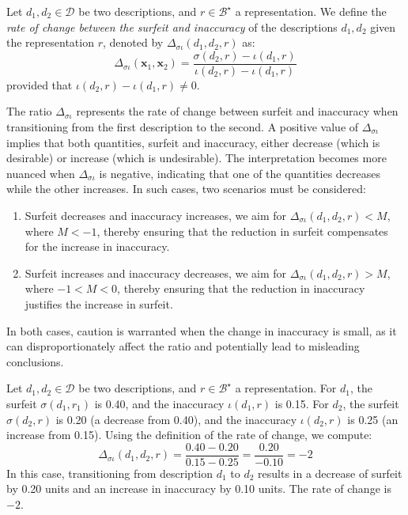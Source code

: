 \begin{definition}
Let $d_1, d_2 \in \mathcal{D}$ be two descriptions, and $r \in \mathcal{B}^\star$ a representation. We define the \emph{rate of change between the surfeit and inaccuracy} of the descriptions $d_1, d_2$ given the representation $r$, denoted by $\Delta_{\sigma \iota} (d_1, d_2, r)$ as:
\[
\Delta_{\sigma \iota} ( \mathbf{x}_1, \mathbf{x}_2 ) = \frac{\sigma(d_2, r) - \iota(d_1, r)}{\iota(d_2, r) - \iota(d_1, r)}
\] 
provided that $\iota(d_2, r) - \iota(d_1, r) \neq 0$.
\end{definition}

The ratio $\Delta_{\sigma \iota}$ represents the rate of change between surfeit and inaccuracy when transitioning from the first description to the second. A positive value of $\Delta_{\sigma \iota}$ implies that both quantities, surfeit and inaccuracy, either decrease (which is desirable) or increase (which is undesirable). The interpretation becomes more nuanced when $\Delta_{\sigma \iota}$ is negative, indicating that one of the quantities decreases while the other increases. In such cases, two scenarios must be considered:

\begin{enumerate}[label=(\roman*)]
\item Surfeit decreases and inaccuracy increases, we aim for $\Delta_{\sigma \iota}(d_1, d_2, r) < M$, where $M < -1$, thereby ensuring that the reduction in surfeit compensates for the increase in inaccuracy.
\item Surfeit increases and inaccuracy decreases, we aim for $\Delta_{\sigma \iota}(d_1, d_2, r) > M$, where $-1 < M < 0$, thereby ensuring that the reduction in inaccuracy justifies the increase in surfeit.
\end{enumerate}

In both cases, caution is warranted when the change in inaccuracy is small, as it can disproportionately affect the ratio and potentially lead to misleading conclusions.

\begin{example}
Let $d_1, d_2 \in \mathcal{D}$ be two descriptions, and $r \in \mathcal{B}^\star$ a representation. For $d_1$, the surfeit $\sigma(d_1, r_1)$ is 0.40, and the inaccuracy $\iota(d_1, r)$ is 0.15. For $d_2$, the surfeit $\sigma(d_2, r)$ is 0.20 (a decrease from 0.40), and the inaccuracy $\iota(d_2, r)$ is 0.25 (an increase from 0.15). Using the definition of the rate of change, we compute:
\[
\Delta_{\sigma \iota} (d_1, d_2, r) = \frac{0.40 - 0.20}{0.15 - 0.25} = \frac{0.20}{-0.10} = -2
\]
In this case, transitioning from description $d_1$ to $d_2$ results in a decrease of surfeit by 0.20 units and an increase in inaccuracy by 0.10 units. The rate of change is $-2$.
\end{example}

